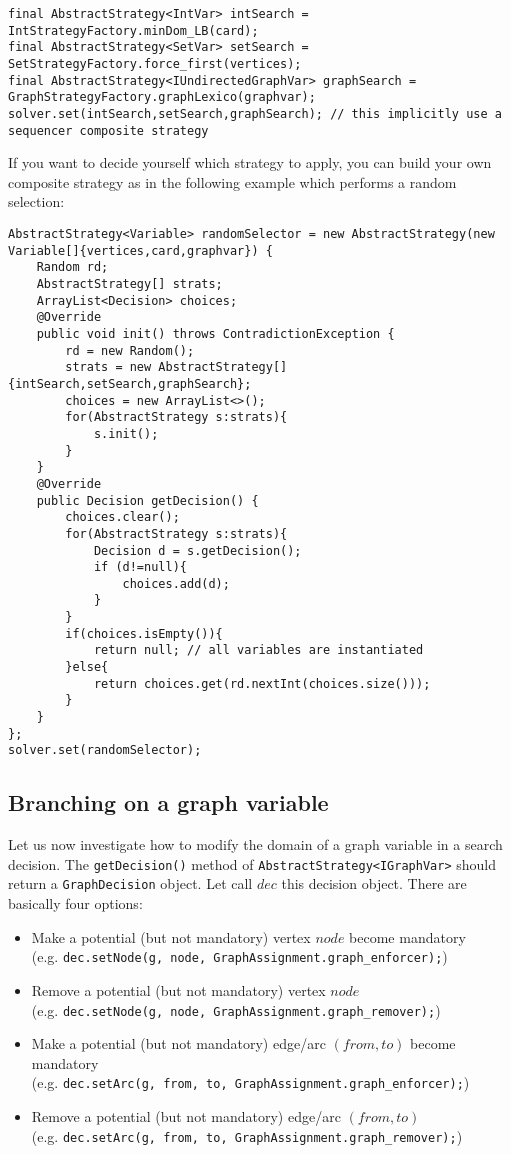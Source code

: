 \documentclass{article}
\begin{document}
\begin{lstlisting}
final AbstractStrategy<IntVar> intSearch = IntStrategyFactory.minDom_LB(card);
final AbstractStrategy<SetVar> setSearch = SetStrategyFactory.force_first(vertices);
final AbstractStrategy<IUndirectedGraphVar> graphSearch = GraphStrategyFactory.graphLexico(graphvar);
solver.set(intSearch,setSearch,graphSearch); // this implicitly use a sequencer composite strategy
\end{lstlisting}

If you want to decide yourself which strategy to apply, you can build your own composite strategy as in the following example which performs a random selection:

\begin{lstlisting}
AbstractStrategy<Variable> randomSelector = new AbstractStrategy(new Variable[]{vertices,card,graphvar}) {
	Random rd;
	AbstractStrategy[] strats;
	ArrayList<Decision> choices;
	@Override
	public void init() throws ContradictionException {
		rd = new Random();
		strats = new AbstractStrategy[]{intSearch,setSearch,graphSearch};
		choices = new ArrayList<>();
		for(AbstractStrategy s:strats){
			s.init();
		}
	}
	@Override
	public Decision getDecision() {
		choices.clear();
		for(AbstractStrategy s:strats){
			Decision d = s.getDecision();
			if (d!=null){
				choices.add(d);
			}
		}
		if(choices.isEmpty()){
			return null; // all variables are instantiated
		}else{
			return choices.get(rd.nextInt(choices.size()));
		}
	}
};
solver.set(randomSelector);
\end{lstlisting}

\subsection{Branching on a graph variable}

Let us now investigate how to modify the domain of a graph variable in a search decision. 
The \texttt{getDecision()} method of \texttt{AbstractStrategy<IGraphVar>} should return a \texttt{GraphDecision} object. Let call $dec$ this decision object. 
There are basically four options:
\begin{itemize} 
\item Make a potential (but not mandatory) vertex $node$ become mandatory \\ 
(e.g. \texttt{dec.setNode(g, node, GraphAssignment.graph\_enforcer);})
\item Remove a potential (but not mandatory) vertex $node$ \\ 
(e.g. \texttt{dec.setNode(g, node, GraphAssignment.graph\_remover);})
\item Make a potential (but not mandatory) edge/arc $(from,to)$ become mandatory \\ 
(e.g. \texttt{dec.setArc(g, from, to, GraphAssignment.graph\_enforcer);})
\item Remove a potential (but not mandatory) edge/arc $(from,to)$ \\ 
(e.g. \texttt{dec.setArc(g, from, to, GraphAssignment.graph\_remover);})
\end{itemize}
\end{document}
